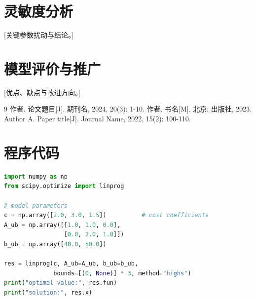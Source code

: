 \documentclass[zihao=-4,a4paper]{ctexart}
\begin{document}
\section{灵敏度分析}

[关键参数扰动与结论。]

\section{模型评价与推广}

[优点、缺点与改进方向。]


\begin{thebibliography}{9}
   作者. 论文题目[J]. 期刊名, 2024, 20(3): 1-10.
   作者. 书名[M]. 北京: 出版社, 2023.
   Author A. Paper title[J]. Journal Name, 2022, 15(2): 100-110.
\end{thebibliography}

\appendix

\section{程序代码}

\begin{lstlisting}[language=Python, caption={求解脚本示例 solve.py}]
import numpy as np
from scipy.optimize import linprog

# model parameters
c = np.array([2.0, 3.0, 1.5])          # cost coefficients
A_ub = np.array([[1.0, 1.0, 0.0],
                 [0.0, 2.0, 1.0]])
b_ub = np.array([40.0, 50.0])

res = linprog(c, A_ub=A_ub, b_ub=b_ub,
              bounds=[(0, None)] * 3, method="highs")
print("optimal value:", res.fun)
print("solution:", res.x)
\end{lstlisting}
\end{document}
